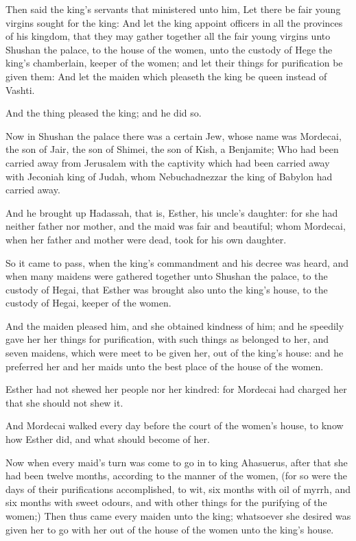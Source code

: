 \verse Then said the king's servants that ministered unto him, Let there be fair young virgins sought for the king: \verse And let the king appoint officers in all the provinces of his kingdom, that they may gather together all the fair young virgins unto Shushan the palace, to the house of the women, unto the custody of Hege the king's chamberlain, keeper of the women; and let their things for purification be given them: \verse And let the maiden which pleaseth the king be queen instead of Vashti.

And the thing pleased the king; and he did so.

\verse Now in Shushan the palace there was a certain Jew, whose name was Mordecai, the son of Jair, the son of Shimei, the son of Kish, a Benjamite; \verse Who had been carried away from Jerusalem with the captivity which had been carried away with Jeconiah king of Judah, whom Nebuchadnezzar the king of Babylon had carried away.

\verse And he brought up Hadassah, that is, Esther, his uncle's daughter: for she had neither father nor mother, and the maid was fair and beautiful; whom Mordecai, when her father and mother were dead, took for his own daughter.

\verse So it came to pass, when the king's commandment and his decree was heard, and when many maidens were gathered together unto Shushan the palace, to the custody of Hegai, that Esther was brought also unto the king's house, to the custody of Hegai, keeper of the women.

\verse And the maiden pleased him, and she obtained kindness of him; and he speedily gave her her things for purification, with such things as belonged to her, and seven maidens, which were meet to be given her, out of the king's house: and he preferred her and her maids unto the best place of the house of the women.

\verse Esther had not shewed her people nor her kindred: for Mordecai had charged her that she should not shew it.

\verse And Mordecai walked every day before the court of the women's house, to know how Esther did, and what should become of her.

\verse Now when every maid's turn was come to go in to king Ahasuerus, after that she had been twelve months, according to the manner of the women, (for so were the days of their purifications accomplished, to wit, six months with oil of myrrh, and six months with sweet odours, and with other things for the purifying of the women;) \verse Then thus came every maiden unto the king; whatsoever she desired was given her to go with her out of the house of the women unto the king's house.


